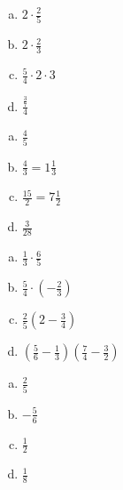 \begin{tehtavasivu}
\begin{tehtava}
        \begin{enumerate}[a)]
        	\item $2 \cdot \frac{2}{5}$
        	\item $2 \cdot \frac{2}{3}$
        	\item $\frac{5}{4} \cdot 2 \cdot 3$
        	\item $\frac{\frac{3}{7}}{4}$ 
        \end{enumerate}
            \begin{vastaus}
        		\begin{enumerate}[a)]
        			\item $\frac{4}{5}$
        			\item $\frac{4}{3} = 1 \frac{1}{3}$
        			\item $\frac{15}{2} = 7 \frac{1}{2}$
        			\item $\frac{3}{28}$
        		\end{enumerate}
            \end{vastaus}
        \end{tehtava}
        
        \begin{tehtava}
        
        \begin{enumerate}[a)]
        	\item $\frac{1}{3} \cdot \frac{6}{5}$
        	\item $\frac{5}{4} \cdot (-\frac{2}{3})$ 
        	\item $\frac{2}{5} (2 - \frac{3}{4})$
        	\item $(\frac{5}{6} - \frac{1}{3})(\frac{7}{4} - \frac{3}{2})$
        \end{enumerate}
            \begin{vastaus}		
        		\begin{enumerate}[a)]
        			\item $\frac{2}{5}$
        			\item $-\frac{5}{6}$
        			\item $\frac{1}{2}$
        			\item $\frac{1}{8}$ 
        		\end{enumerate}
            \end{vastaus}
        \end{tehtava}
        
        \begin{tehtava}
        

\end{tehtava}
\end{tehtavasivu}
